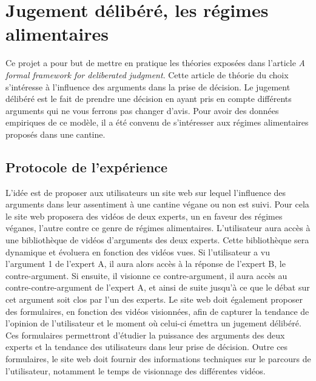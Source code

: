 \chapter[Jugement délibéré, les régimes alimentaires]{Jugement délibéré, les régimes alimentaires\raisebox{.3\baselineskip}{\normalsize\footnotemark}}
Ce projet a pour but de mettre en pratique les théories exposées dans l'article \textit{A formal framework for deliberated judgment}\cite{cailloux_formal_2020}. Cette article de théorie du choix s'intéresse à l'influence des arguments dans la prise de décision. Le jugement délibéré est le fait de prendre une décision en ayant pris en compte différents arguments qui ne vous ferrons pas changer d'avis. Pour avoir des données empiriques de ce modèle, il a été convenu de s'intéresser aux régimes alimentaires proposés dans une cantine.

\section{Protocole de l'expérience}
L'idée est de proposer aux utilisateurs un site web sur lequel l'influence des arguments dans leur assentiment à une cantine végane ou non est suivi. Pour cela le site web proposera des vidéos de deux experts, un en faveur des régimes véganes, l'autre contre ce genre de régimes alimentaires. L'utilisateur aura accès à une bibliothèque de vidéos d'arguments des deux experts. Cette bibliothèque sera dynamique et évoluera en fonction des vidéos vues. Si l'utilisateur a vu l'argument 1 de l'expert A, il aura alors accès à la réponse de l'expert B, le contre-argument. Si ensuite, il visionne ce contre-argument, il aura accès au contre-contre-argument de l'expert A, et ainsi de suite jusqu'à ce que le débat sur cet argument soit clos par l'un des experts. Le site web doit également proposer des formulaires, en fonction des vidéos visionnées, afin de capturer la tendance de l'opinion de l'utilisateur et le moment où celui-ci émettra un jugement délibéré. Ces formulaires permettront d'étudier la puissance des arguments des deux experts et la tendance des utilisateurs dans leur prise de décision. Outre ces formulaires, le site web doit fournir des informations techniques sur le parcours de l'utilisateur, notamment le temps de visionnage des différentes vidéos.

